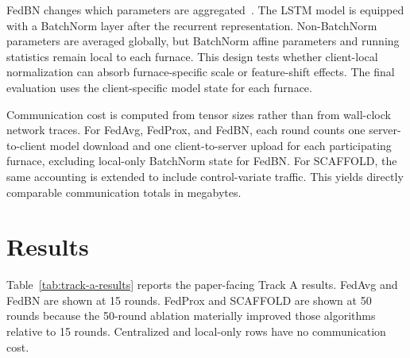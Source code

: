\documentclass[pdflatex,sn-mathphys-num]{sn-jnl}
\theoremstyle{thmstyleone}%
\theoremstyle{thmstyletwo}%
\theoremstyle{thmstylethree}%
\begin{document}
FedBN changes which parameters are aggregated~\cite{li2021fedbn}. The LSTM model is equipped with a BatchNorm layer after the recurrent representation. Non-BatchNorm parameters are averaged globally, but BatchNorm affine parameters and running statistics remain local to each furnace. This design tests whether client-local normalization can absorb furnace-specific scale or feature-shift effects. The final evaluation uses the client-specific model state for each furnace.

Communication cost is computed from tensor sizes rather than from wall-clock network traces. For FedAvg, FedProx, and FedBN, each round counts one server-to-client model download and one client-to-server upload for each participating furnace, excluding local-only BatchNorm state for FedBN. For SCAFFOLD, the same accounting is extended to include control-variate traffic. This yields directly comparable communication totals in megabytes.

\section{Results}\label{sec:results}

Table~\ref{tab:track-a-results} reports the paper-facing Track A results. FedAvg and FedBN are shown at 15 rounds. FedProx and SCAFFOLD are shown at 50 rounds because the 50-round ablation materially improved those algorithms relative to 15 rounds. Centralized and local-only rows have no communication cost.
\end{document}
